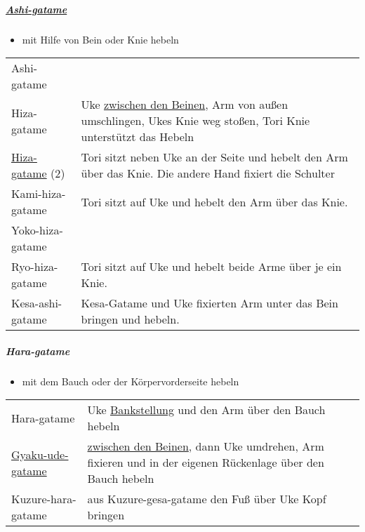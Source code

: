 \documentclass[justified, a4paper, notitlepage, captions=tableheading, nobib]{tufte-handout}
\begin{document}
\subparagraph{\hyperref[org8026a3f]{Ashi-gatame}}
\label{sec:orgf9d29b3}

\begin{itemize}
\item mit Hilfe von Bein oder Knie hebeln
\end{itemize}

\begin{center}
\begin{tabular}{ll}
\label{org8026a3f}Ashi-gatame & \\
\label{orge854c9c}Hiza-gatame & Uke \hyperref[orgf285c69]{zwischen den Beinen}, Arm von außen umschlingen, Ukes Knie weg stoßen, Tori Knie unterstützt das Hebeln\\
\hyperref[orge854c9c]{Hiza-gatame} (2) & Tori sitzt neben Uke an der Seite und hebelt den Arm über das Knie. Die andere Hand fixiert die Schulter\\
\label{org822bb8b}Kami-hiza-gatame & Tori sitzt auf Uke und hebelt den Arm über das Knie.\\
\label{orgbdbffd3}Yoko-hiza-gatame & \\
\label{orgcac9f7c}Ryo-hiza-gatame & Tori sitzt auf Uke und hebelt beide Arme über je ein Knie.\\
\label{orga254e4a}Kesa-ashi-gatame & Kesa-Gatame und Uke fixierten Arm unter das Bein bringen und hebeln.\\
\end{tabular}
\end{center}

\subparagraph{Hara-gatame}
\label{sec:org51323aa}

\begin{itemize}
\item mit dem Bauch oder der Körpervorderseite hebeln
\end{itemize}

\begin{center}
\begin{tabular}{ll}
Hara-gatame & Uke \hyperref[org37bd524]{Bankstellung} und den Arm über den Bauch hebeln\\
\hyperref[org33e6d7e]{Gyaku-ude-gatame} & \hyperref[orgf285c69]{zwischen den Beinen}, dann Uke umdrehen, Arm fixieren und in der eigenen Rückenlage über den Bauch hebeln\\
Kuzure-hara-gatame & aus Kuzure-gesa-gatame den Fuß über Uke Kopf bringen\\
\end{tabular}
\end{center}
\end{document}
